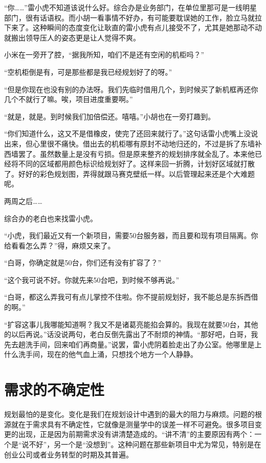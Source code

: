 \documentclass[12pt,UTF8]{ctexbook}
\begin{document}
“你……”雷小虎不知道该说什么好。综合办是业务部门，在单位里那可是一线明星部门，很有话语权。而小胡一看事情不好办，有可能要耽误她的工作，脸立马就拉下来了。这种瞬间的态度变化让耿直的雷小虎有点儿接受不了，尤其是她那动不动就搬出领导压人的姿态更是让人觉得不爽。

小米在一旁开了腔，“据我所知，咱们不是还有空闲的机柜吗？”

“空机柜倒是有，可是那些都是我已经规划好了的呀。”

“但是你现在也没有别的办法呀。我们先临时借用几个，到时候买了新机框再还你几个不就行了嘛。唉，项目进度重要啊。”

“就是，就是。到时候我们加倍偿还。嘻嘻。”小胡也在一旁打趣到。

“你们知道什么，这又不是借橡皮，使完了还回来就行了。”这句话雷小虎嘴上没说出来，但心里很不痛快。借出去的机柜哪有原封不动地归还的，不过是拆了东墙补西墙罢了。虽然数量上是没有亏损。但是原来整齐的规划排序就全乱了。本来他已经将不同的区域都用颜色标识给规划好了。这样来回一折腾，计划好区域就打散了。好好的彩色规划图，弄得就跟马赛克壁纸一样。以后管理起来还是个大难题呢。

两周之后……

综合办的老白也来找雷小虎。

“小虎，我们最近又有一个新项目，需要50台服务器，而且要和现有项目隔离。你给看看怎么弄？”得，麻烦又来了。

“白哥，你确定就是50台，你们还有没有扩容了？”

“这个我可说不好。你就先来50台吧，到时候不够再说。”

“白哥，都这么弄我可有点儿掌控不住啦。你不提前规划好，我不能总是东拆西借的啊。”

“扩容这事儿我哪能知道啊？我又不是诸葛亮能掐会算的。我现在就要50台，其他的以后再说。”话没说两句，老白反倒先露出了不耐烦的神情。“那好吧，白哥，我先去趟洗手间，回来咱们再商量。”说罢，雷小虎阴着脸走出了办公室。他哪里是上什么洗手间，现在的他气血上涌，只想找个地方一个人静静。

\section{需求的不确定性}

规划最怕的是变化。变化是我们在规划设计中遇到的最大的阻力与麻烦。问题的根源就在于需求具有不确定性，它就像是测量学中的误差一样不可避免。很多项目变更的出现，正是因为前期需求没有讲清楚造成的。“讲不清”的主要原因有两个：一个是“说不好”，另一个是“没想到”。这种问题在那些新项目中尤为常见，特别是在创业公司或者业务转型的时期及其普遍。
\end{document}
